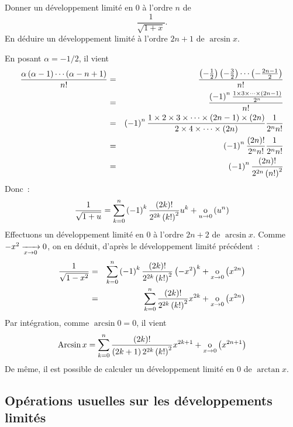 \documentclass{magnoliaold}
\begin{document}

\begin{exoUnique}
\exo Donner un développement limité en 0 à l'ordre $n$ de
  \[\frac{1}{\sqrt{1+x}}.\]
  En déduire un développement limité à l'ordre $2n+1$ de $\arcsin x$.
  \begin{sol}
  En posant $\alpha=-1/2$, il vient
  \begin{eqnarray*}
  \frac{\alpha\p{\alpha-1}\cdots\p{\alpha-n+1}}{n!}
  &=& \frac{\p{-\frac{1}{2}}\p{-\frac{3}{2}}\cdots\p{-\frac{2n-1}{2}}}{n!}\\
  &=& \frac{\p{-1}^n\frac{1\times 3\times\cdots\times\p{2n-1}}{2^n}}{n!}\\
  &=& \p{-1}^n\frac{1\times 2\times 3\times\cdots\times\p{2n-1}\times\p{2n}}%
       {2\times 4\times\cdots\times\p{2n}}\frac{1}{2^n n!}\\
  &=& \p{-1}^n\frac{\p{2n}!}{2^nn!}\frac{1}{2^n n!}\\
  &=& \p{-1}^n\frac{\p{2n}!}{2^{2n}\p{n!}^2}
  \end{eqnarray*}
  Donc~:
  \[\frac{1}{\sqrt{1+u}}=\sum_{k=0}^n \left(-1\right)^k\frac{\left(2k\right)!}{2^{2k}\left(k!\right)^2}u^k
    +\underset{u \rightarrow 0}{\text{o}}\left(u^n\right)\]    
  Effectuons un développement limité en 0 à l'ordre $2n+2$ de $\arcsin x$.
  Comme $-x^2\xrightarrow[x\rightarrow 0]{}0$, on en déduit, d'après le développement limité
  précédent~:
  \begin{eqnarray*}
  \frac{1}{\sqrt{1-x^2}}
  &=& \sum_{k=0}^n \left(-1\right)^k\frac{\left(2k\right)!}{2^{2k}\left(k!\right)^2}\left(-x^2\right)^k+
       \underset{x \rightarrow 0}{\text{o}}\left(x^{2n}\right)\\
  &=& \sum_{k=0}^n \frac{\left(2k\right)!}{2^{2k}\left(k!\right)^2} x^{2k}+
       \underset{x \rightarrow 0}{\text{o}}\left(x^{2n}\right)
  \end{eqnarray*}
  Par intégration, comme $\arcsin 0=0$, il vient
  \[\operatorname{Arcsin} x= \sum_{k=0}^n \frac{\left(2k\right)!}{\left(2k+1\right)2^{2k}\left(k!\right)^2} x^{2k+1}+
       \underset{x \rightarrow 0}{\text{o}}\left(x^{2n+1}\right)\]
  De même, il est possible de calculer un développement limité en 0 de
  $\arctan x$.
  \end{sol}
\end{exoUnique}

\subsection{Opérations usuelles sur les développements limités}
\end{document}
